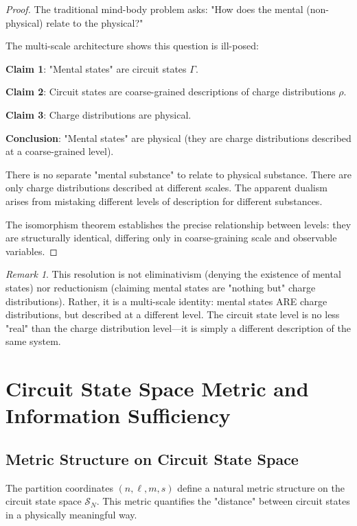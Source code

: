 \documentclass[aps,prd,twocolumn,superscriptaddress,floatfix,nofootinbib]{revtex4-2}
\theoremstyle{remark}
\newtheorem{remark}[theorem]{Remark}
\begin{document}
\begin{proof}
The traditional mind-body problem asks: "How does the mental (non-physical) relate to the physical?"

The multi-scale architecture shows this question is ill-posed:

\textbf{Claim 1}: "Mental states" are circuit states $\Gamma$.

\textbf{Claim 2}: Circuit states are coarse-grained descriptions of charge distributions $\rho$.

\textbf{Claim 3}: Charge distributions are physical.

\textbf{Conclusion}: "Mental states" are physical (they are charge distributions described at a coarse-grained level).

There is no separate "mental substance" to relate to physical substance. There are only charge distributions described at different scales. The apparent dualism arises from mistaking different levels of description for different substances.

The isomorphism theorem establishes the precise relationship between levels: they are structurally identical, differing only in coarse-graining scale and observable variables.
\end{proof}

\begin{remark}
This resolution is not eliminativism (denying the existence of mental states) nor reductionism (claiming mental states are "nothing but" charge distributions). Rather, it is a multi-scale identity: mental states ARE charge distributions, but described at a different level. The circuit state level is no less "real" than the charge distribution level—it is simply a different description of the same system.
\end{remark}

\section{Circuit State Space Metric and Information Sufficiency}
\label{sec:sdistance}

\subsection{Metric Structure on Circuit State Space}

The partition coordinates $(n, \ell, m, s)$ define a natural metric structure on the circuit state space $\mathcal{S}_N$. This metric quantifies the "distance" between circuit states in a physically meaningful way.
\end{document}
